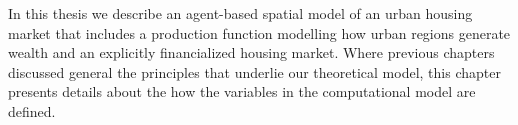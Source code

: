 





In this thesis  we describe an agent-based spatial model of an urban housing market that includes a production function modelling how urban regions generate wealth and an explicitly financialized housing market.  Where previous chapters discussed general the principles that underlie our theoretical model, this chapter presents details about the how the variables in the computational model are defined. %


